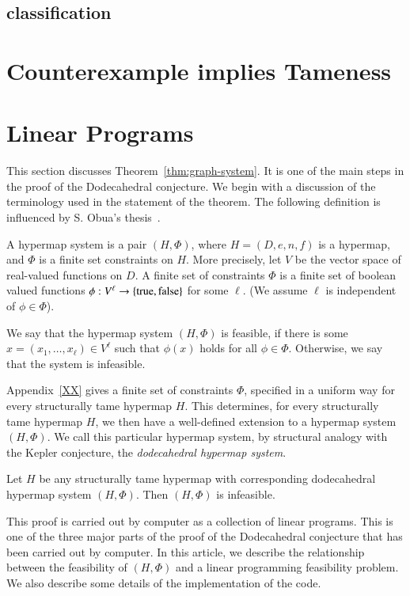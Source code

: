 \subsection{classification}


\section{Counterexample implies Tameness}

\section{Linear Programs}

This section discusses Theorem~\ref{thm:graph-system}.  It is one of
the main steps in the proof of the Dodecahedral conjecture.
We begin with a discussion of the terminology used in the
statement of the theorem.
The following definition is influenced by S. Obua's thesis~\cite{Ob}.

\begin{definition} A hypermap system is a pair $(H,\Phi)$,
where $H=(D,e,n,f)$ is a hypermap, and $\Phi$ is a finite set constraints on $H$.  More precisely, let $V$ be the vector space of
real-valued functions on $D$.  A finite set of constraints $\Phi$ is a finite
set of boolean valued functions $\phi:V^\ell\to \{{\operatorname{true}},{\operatorname{false}}\}$
for some $\ell$. (We assume $\ell$ is independent of $\phi\in \Phi$).
\end{definition}

We say that the hypermap system $(H,\Phi)$ is feasible, if
there is some $x=(x_1,\ldots,x_\ell)\in V^\ell$ such that
$\phi(x)$ holds for all $\phi\in\Phi$. Otherwise, we say that
the system is infeasible.

Appendix~\ref{XX} gives a finite set of constraints $\Phi$, 
specified
in a uniform way for every structurally tame hypermap $H$.  This determines,
for every structurally tame hypermap $H$, we then have a well-defined extension
to a hypermap system $(H,\Phi)$.  We call this particular hypermap
system, by structural analogy with the Kepler conjecture,
the {\it dodecahedral hypermap system}.  


\begin{theorem}\label{thm:graph-system}  Let 
$H$ be any structurally tame hypermap with corresponding
dodecahedral hypermap system $(H,\Phi)$.  Then $(H,\Phi)$ is infeasible.
\end{theorem}

This proof is carried out by computer as a collection of linear
programs.  This is one of the three major parts of the proof
of the Dodecahedral conjecture that has been carried out by computer.
In this article, we describe the relationship between the
feasibility of $(H,\Phi)$ and a linear programming feasibility
problem.  We also describe some details of the implementation of 
the code.

